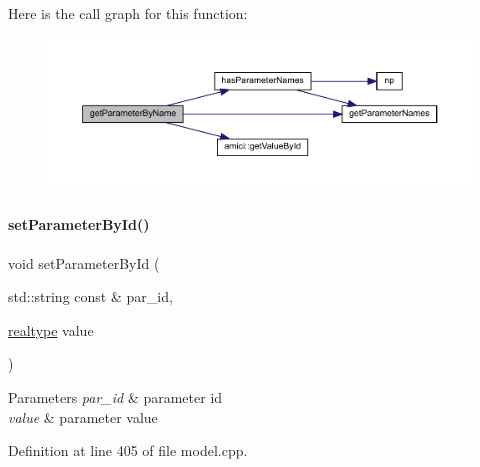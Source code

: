 Here is the call graph for this function\+:
\nopagebreak
\begin{figure}[H]
\begin{center}
\leavevmode
\includegraphics[width=350pt]{classamici_1_1_model_a19b349ca9793d45fda7ef8ea7422747a_cgraph}
\end{center}
\end{figure}
\mbox{\label{classamici_1_1_model_a995357a19663980279249d4b89a88f7a}} 
\paragraph{\texorpdfstring{set\+Parameter\+By\+Id()}{setParameterById()}}
{\footnotesize\ttfamily void set\+Parameter\+By\+Id (\begin{DoxyParamCaption}\item[{std\+::string const \&}]{par\+\_\+id,  }\item[{\mbox{\hyperlink{namespaceamici_a1bdce28051d6a53868f7ccbf5f2c14a3}{realtype}}}]{value }\end{DoxyParamCaption})}


\begin{DoxyParams}{Parameters}
{\em par\+\_\+id} & parameter id \\
\hline
{\em value} & parameter value \\
\hline
\end{DoxyParams}


Definition at line 405 of file model.\+cpp.

